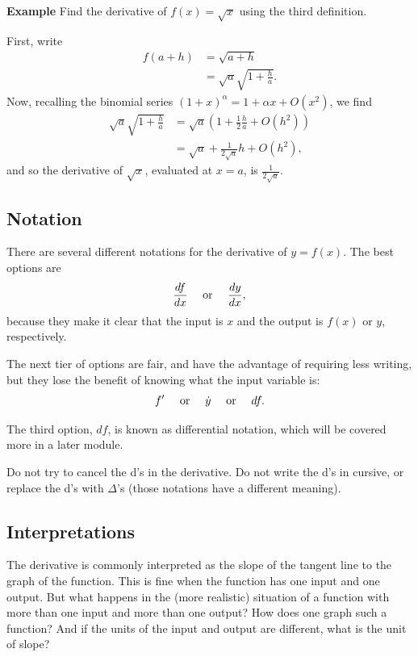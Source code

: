 \documentclass[twoside,openright,titlepage,a4paper]{book}
\begin{document}
\begin{sloppypar}
\textbf{Example} Find the derivative of $f(x) = \sqrt{x}$ using the third definition. 
\begin{examplebox}
First, write
\begin{align*} 
f(a+h) &= \sqrt{a+h} \\
&= \sqrt{a} \sqrt{1 + \frac{h}{a}}. 
\end{align*}
Now, recalling the binomial series $(1+x)^\alpha = 1 + \alpha x + O(x^2)$, we find
\begin{align*}
\sqrt{a} \sqrt{1 + \frac{h}{a}} &= \sqrt{a} \left(1 + \frac{1}{2}\frac{h}{a} + O(h^2)\right) \\
&= \sqrt{a} + \frac{1}{2\sqrt{a}} h + O(h^2),
\end{align*}
and so the derivative of $\sqrt{x}$, evaluated at $x=a$, is $\frac{1}{2 \sqrt{a}}$.
\end{examplebox}

\subsection{Notation}

There are several different notations for the derivative of $y=f(x)$. The best options are \[ \frac{df}{dx} \quad \hbox{ or } \quad \frac{dy}{dx}, \] because they make it clear that the input is $x$ and the output is $f(x)$ or $y$, respectively.

The next tier of options are fair, and have the advantage of requiring less writing, but they lose the benefit of knowing what the input variable is:
\[ f' \quad \hbox{ or } \quad \dot{y} \quad \hbox{ or } \quad df. \]

The third option, $df$, is known as differential notation, which will be covered more in a later module.

Do not try to cancel the d's in the derivative. Do not write the d's in cursive, or replace the d's with $\Delta$'s (those notations have a different meaning).

\subsection{Interpretations}

The derivative is commonly interpreted as the slope of the tangent line to the graph of the function. This is fine when the function has one input and one output. But what happens in the (more realistic) situation of a function with more than one input and more than one output? How does one graph such a function? And if the units of the input and output are different, what is the unit of slope?


\end{sloppypar}
\end{document}
